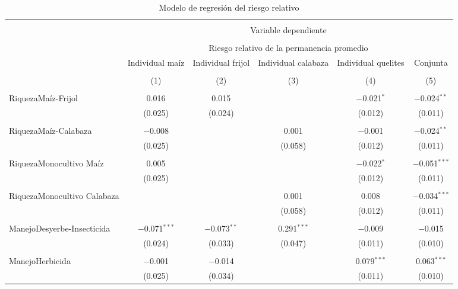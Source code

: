 \documentclass[spanish,11pt]{article}
\begin{document}
\begin{table}[!htbp] \centering 
  \caption{Modelo de regresión del riesgo relativo} 
  \label{} 
\begin{tabular}{@{\extracolsep{5pt}}lccccc} 
\\[-1.8ex]\hline 
\hline \\[-1.8ex] 
 & \multicolumn{5}{c}{Variable dependiente} \\ 
\cline{2-6} 
\\[-1.8ex] & \multicolumn{5}{c}{Riesgo relativo de la permanencia promedio} \\ 
 & Individual maíz & Individual frijol & Individual calabaza & Individual quelites & Conjunta \\ 
\\[-1.8ex] & (1) & (2) & (3) & (4) & (5)\\ 
\hline \\[-1.8ex] 
 RiquezaMaíz-Frijol & 0.016 & 0.015 &  & $-$0.021$^{*}$ & $-$0.024$^{**}$ \\ 
  & (0.025) & (0.024) &  & (0.012) & (0.011) \\ 
  & & & & & \\ 
 RiquezaMaíz-Calabaza & $-$0.008 &  & 0.001 & $-$0.001 & $-$0.024$^{**}$ \\ 
  & (0.025) &  & (0.058) & (0.012) & (0.011) \\ 
  & & & & & \\ 
 RiquezaMonocultivo Maíz & 0.005 &  &  & $-$0.022$^{*}$ & $-$0.051$^{***}$ \\ 
  & (0.025) &  &  & (0.012) & (0.011) \\ 
  & & & & & \\ 
 RiquezaMonocultivo Calabaza &  &  & 0.001 & 0.008 & $-$0.034$^{***}$ \\ 
  &  &  & (0.058) & (0.012) & (0.011) \\ 
  & & & & & \\ 
 ManejoDesyerbe-Insecticida & $-$0.071$^{***}$ & $-$0.073$^{**}$ & 0.291$^{***}$ & $-$0.009 & $-$0.015 \\ 
  & (0.024) & (0.033) & (0.047) & (0.011) & (0.010) \\ 
  & & & & & \\ 
 ManejoHerbicida & $-$0.001 & $-$0.014 &  & 0.079$^{***}$ & 0.063$^{***}$ \\ 
  & (0.025) & (0.034) &  & (0.011) & (0.010) \\ 

\end{tabular}
\end{table}
\end{document}
